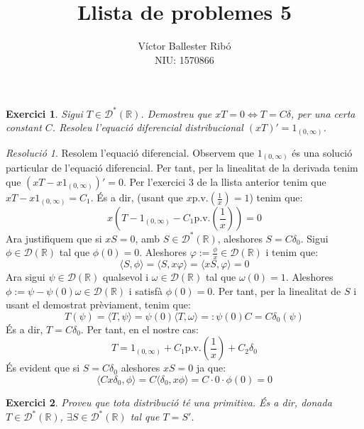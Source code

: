 \documentclass[10pt,a4paper]{article}
\title{\bfseries\Large Llista de problemes 5}
\author{Víctor Ballester Ribó\\NIU: 1570866}
\date{\parbox{\linewidth}{\centering
  Anàlisi Harmònica\endgraf
  Grau en Matemàtiques\endgraf
  Universitat Autònoma de Barcelona\endgraf
  Abril de 2023}}
\newcommand{\RR}{\ensuremath{\mathbb{R}}} %
\newcommand{\vf}[1]{\boldsymbol{\mathrm{#1}}} %
\newtheorem{exercici}{Exercici}
\theoremstyle{definition}
\theoremstyle{remark}
\newtheorem*{res}{Resolució}
\renewcommand{\pv}{\mathrm{p.v.}} %
\begin{document}
\maketitle
\begin{exercici}
  Sigui $T\in \mathcal{D}^*(\RR)$. Demostreu que $xT=0\iff T=C\delta$, per una certa constant $C$. Resoleu l'equació diferencial distribucional ${(xT)}'=\vf{1}_{(0,\infty)}$.
\end{exercici}
\begin{res}
  Resolem l'equació diferencial. Observem que $\vf{1}_{(0,\infty)}$ és una solució particular de l'equació diferencial. Per tant, per la linealitat de la derivada tenim que ${(xT - x\vf{1}_{(0,\infty)})}'=0$. Per l'exercici 3 de la llista anterior tenim que $xT - x\vf{1}_{(0,\infty)}=C_1$. És a dir, (usant que $x\pv\left(\frac{1}{x}\right)=1$) tenim que:
  $$
    x\left(T-\vf{1}_{(0,\infty)}-C_1\pv\left(\frac{1}{x}\right)\right)=0
  $$
  Ara justifiquem que si $xS=0$, amb $S\in\mathcal{D}^*(\RR)$, aleshores $S=C\delta_0$. Sigui $\phi\in\mathcal{D}(\RR)$ tal que $\phi(0)=0$. Aleshores $\varphi:=\frac{\phi}{x}\in\mathcal{D}(\RR)$ i tenim que:
  $$\langle S,\phi\rangle=\langle S,x\varphi\rangle=\langle xS,\varphi\rangle=0$$
  Ara sigui $\psi\in\mathcal{D}(\RR)$ qualsevol i $\omega\in \mathcal{D}(\RR)$ tal que $\omega(0)=1$. Aleshores $\phi:=\psi-\psi(0)\omega\in\mathcal{D}(\RR)$ i satisfà $\phi(0)=0$. Per tant, per la linealitat de $S$ i usant el demostrat prèviament, tenim que:
  $$
    T(\psi)=\langle T,\psi \rangle =\psi(0) \langle T,\omega \rangle =: \psi(0) C=C\delta_0(\psi)
  $$
  És a dir, $T=C\delta_0$. Per tant, en el nostre cas:
  $$
    T=\vf{1}_{(0,\infty)}+C_1\pv\left(\frac{1}{x}\right)+C_2\delta_0
  $$
  És evident que si $S=C\delta_0$ aleshores $xS=0$ ja que:
  $$
    \langle Cx\delta_0,\phi\rangle = C\langle \delta_0,x\phi\rangle = C\cdot0\cdot\phi(0)=0
  $$
\end{res}
\begin{exercici}
  Proveu que tota distribució té una primitiva. És a dir, donada $T\in\mathcal{D}^*(\RR)$, $\exists S\in\mathcal{D}^*(\RR)$ tal que $T=S'$.
\end{exercici}
\end{document}
